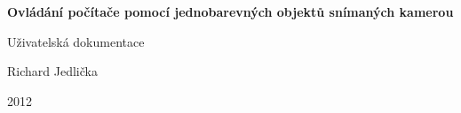 \documentclass[12pt,a4paper]{article}
\let\openright=\clearpage
\begin{document}


\pagestyle{empty}
\begin{center}

\large



\vspace*{3cm}

{\LARGE\bfseries Ovládání počítače pomocí jednobarevných objektů snímaných kamerou}

\vfill

{\Huge Uživatelská dokumentace}

\vfill

{\large Richard Jedlička}

\vfill

2012

\end{center}

\newpage



\openright

\newpage


\openright
\pagestyle{plain}
\setcounter{page}{1}
\tableofcontents

\thispagestyle{empty}




\end{document}
